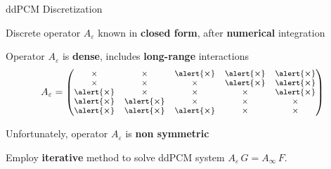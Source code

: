 \begin{frame}{ddPCM Discretization}
\begin{wideitemize}
\item Discrete operator $A_\varepsilon$ known in {\bf closed form}, after {\bf numerical} integration
\item Operator $A_\varepsilon$ is {\bf dense}, includes {\bf long-range} interactions
\[ A_\varepsilon =
{\footnotesize
\begin{pmatrix}
\times				& \times					& \alert{\boldsymbol{\times}}	& \alert{\boldsymbol{\times}} 	& \alert{\boldsymbol{\times}} \\
\times				& \times					& \times					& \alert{\boldsymbol{\times}} 	& \alert{\boldsymbol{\times}} \\
\alert{\boldsymbol{\times}}	& \times					& \times					& \times 					& \alert{\boldsymbol{\times}} \\
\alert{\boldsymbol{\times}}	& \alert{\boldsymbol{\times}}	& \times					& \times 					& \times \\
\alert{\boldsymbol{\times}}	& \alert{\boldsymbol{\times}}	& \alert{\boldsymbol{\times}}	& \times 					& \times 
\end{pmatrix}
}  \displaybump
\]
\item Unfortunately, operator $A_\varepsilon$ is {\bf non symmetric}
\item Employ {\bf iterative} method to solve ddPCM system $A_\varepsilon \, G = A_\infty \, F$.
\end{wideitemize}


\end{frame}


